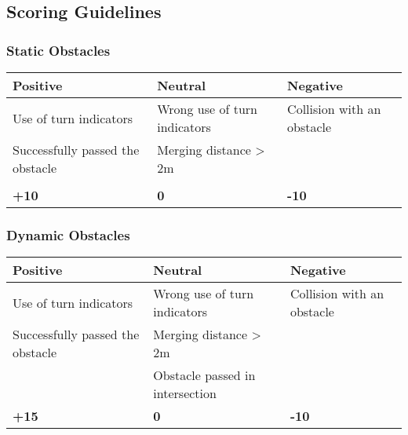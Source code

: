 {	\subsection{Scoring Guidelines}
	\label{obstacle_scoring_guidelines}

	\subsubsection*{Static Obstacles}
	\begin{table}[H]
		\begin{tabularx}{\textwidth}{XXX}
			\toprule
			\textbf{Positive}                & \textbf{Neutral}             & \textbf{Negative}          \\
			\midrule
			Use of turn indicators           & Wrong use of turn indicators & Collision with an obstacle \\
			Successfully passed the obstacle & Merging distance > 2m        &                            \\
			                                 &                              &                            \\
			\topstrut
			\textbf{+10}                     & \textbf{0}                   & \textbf{-10}               \\
			\bottomrule
		\end{tabularx}
	\end{table}

	\subsubsection*{Dynamic Obstacles}
	\begin{table}[H]
		\begin{tabularx}{\textwidth}{XXX}
			\toprule
			\textbf{Positive}                & \textbf{Neutral}                & \textbf{Negative}          \\
			\midrule
			Use of turn indicators           & Wrong use of turn indicators    & Collision with an obstacle \\
			Successfully passed the obstacle & Merging distance > 2m           &                            \\
			                                 & Obstacle passed in intersection &                            \\
			\topstrut
			\textbf{+15}                     & \textbf{0}                      & \textbf{-10}               \\
			\bottomrule
		\end{tabularx}
	\end{table}

}

